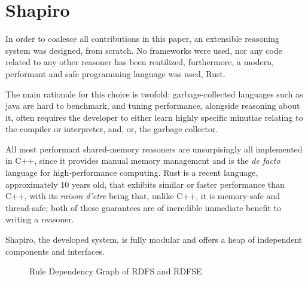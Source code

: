 \section{Shapiro}
In order to coalesce all contributions in this paper, an extensible reasoning system was designed, from scratch. No frameworks
were used, nor any code related to any other reasoner has been reutilized, furthermore, a modern, performant and safe programming
language was used, Rust\cite{rust_lang}.

The main rationale for this choice is twofold: garbage-collected languages such as java are hard to benchmark, and tuning
performance, alongside reasoning about it, often requires the developer to either learn highly specific minutiae relating
to the compiler or interpreter, and, or, the garbage collector.

All most performant shared-memory reasoners are unsurpisingly all implemented in C++\cite{rdfox, vadalog, souffle}, since
it provides manual memory management and is the \textit{de facto} language for high-performance computing. Rust is a
recent language, approximately 10 years old, that exhibits similar or faster performance than C++, with its \textit{raison d'etre}
being that, unlike C++, it is memory-safe and thread-safe\cite{rust2014,rustbelt,rustsafety}; both of these guarantees are
of incredible immediate benefit to writing a reasoner.

Shapiro, the developed system, is fully modular and offers a heap of independent components and interfaces.

\begin{figure} [htb!]
	\centering
	\caption{Rule Dependency Graph of RDFS and RDFSE}
	\label{fig:rdgrr}
\end{figure}

